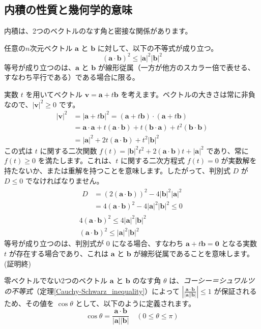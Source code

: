 \subsection{内積の性質と幾何学的意味}
内積は、2つのベクトルのなす角と密接な関係があります。
\begin{thm} \label{Cauchy-Schwarz_inequality}
任意の$n$次元ベクトル $\bm{a}$ と $\bm{b}$ に対して、以下の不等式が成り立つ。
\[(\bm{a} \cdot \bm{b})^2 \le |\bm{a}|^2 |\bm{b}|^2\]
等号が成り立つのは、$\bm{a}$ と $\bm{b}$ が線形従属（一方が他方のスカラー倍で表せる、すなわち平行である）である場合に限る。
\begin{proof*}
実数 $t$ を用いてベクトル $\bm{v} = \bm{a} + t\bm{b}$ を考えます。ベクトルの大きさは常に非負なので、$|\bm{v}|^2 \ge 0$ です。
\begin{align*}
|\bm{v}|^2 &= |\bm{a} + t\bm{b}|^2 = (\bm{a} + t\bm{b}) \cdot (\bm{a} + t\bm{b})\\
&= \bm{a} \cdot \bm{a} + t(\bm{a} \cdot \bm{b}) + t(\bm{b} \cdot \bm{a}) + t^2(\bm{b} \cdot \bm{b})\\
&= |\bm{a}|^2 + 2t(\bm{a} \cdot \bm{b}) + t^2|\bm{b}|^2
\end{align*}
この式は $t$ に関する二次関数 $f(t) = |\bm{b}|^2 t^2 + 2(\bm{a} \cdot \bm{b}) t + |\bm{a}|^2$ であり、常に $f(t) \ge 0$ を満たします。これは、$t$ に関する二次方程式 $f(t) = 0$ が実数解を持たないか、または重解を持つことを意味します。したがって、判別式 $D$ が $D \le 0$ でなければなりません。
\begin{gather*}
\begin{aligned}
D &= (2(\bm{a} \cdot \bm{b}))^2 - 4|\bm{b}|^2 |\bm{a}|^2\\
&= 4(\bm{a} \cdot \bm{b})^2 - 4|\bm{a}|^2 |\bm{b}|^2 \le 0
\end{aligned}\\
4(\bm{a} \cdot \bm{b})^2 \le 4|\bm{a}|^2 |\bm{b}|^2\\
(\bm{a} \cdot \bm{b})^2 \le |\bm{a}|^2 |\bm{b}|^2
\end{gather*}
等号が成り立つのは、判別式が $0$ になる場合、すなわち $\bm{a} + t\bm{b} = \bm{0}$ となる実数 $t$ が存在する場合であり、これは $\bm{a}$ と $\bm{b}$ が線形従属であることを意味します。
(証明終)
\end{proof*}
\end{thm}

\begin{dfn} \label{cosine}
零ベクトルでない2つのベクトル $\bm{a}$ と $\bm{b}$ のなす角 $\theta$ は、\emph{コーシー＝シュワルツの不等式}（定理\ref{Cauchy-Schwarz_inequality}）によって $\left| \frac{\bm{a} \cdot \bm{b}}{|\bm{a}| |\bm{b}|} \right| \le 1$ が保証されるため、その値を $\cos\theta$ として、以下のように定義されます。
\[\cos\theta = \frac{\bm{a} \cdot \bm{b}}{|\bm{a}| |\bm{b}|} \quad (0 \le \theta \le \pi)\]
\end{dfn}

